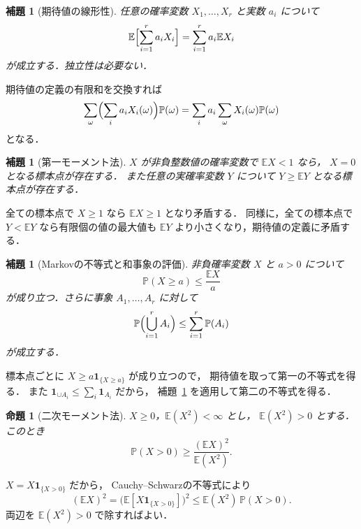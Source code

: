\documentclass[a5paper,10pt,onecolumn]{jsarticle}
\makeatletter
\theoremstyle{mathnotetheorem}
\newtheorem{lemma}[theorem]{補題}
\newtheorem{proposition}[theorem]{命題}
\renewcommand{\proofname}{証明}
\renewenvironment{proof}[1][\proofname]{%
  \par\pushQED{\qed}\normalfont\topsep4\p@\@plus2\p@\relax
  \trivlist\item[\hskip\labelsep\bfseries #1]\ignorespaces
}{\popQED\endtrivlist\@endpefalse}
\makeatother
\begin{document}
\begin{lemma}[期待値の線形性]\label{lem:linearity}
任意の確率変数 $X_1,\ldots,X_r$ と実数 $a_i$ について
\[
 \mathbb E\Bigl[\sum_{i=1}^ra_iX_i\Bigr]
 =\sum_{i=1}^ra_i\mathbb EX_i
\]
が成立する．独立性は必要ない．
\end{lemma}
\begin{proof}
期待値の定義の有限和を交換すれば
\[
 \sum_\omega\Bigl(\sum_i a_iX_i(\omega)\Bigr)\mathbb P(\omega)
 =\sum_i a_i\sum_\omega X_i(\omega)\mathbb P(\omega)
\]
となる．
\end{proof}

\begin{lemma}[第一モーメント法]\label{lem:firstmoment}
$X$ が非負整数値の確率変数で $\mathbb EX<1$ なら，
$X=0$ となる標本点が存在する．
また任意の実確率変数 $Y$ について
$Y\ge\mathbb EY$ となる標本点が存在する．
\end{lemma}
\begin{proof}
全ての標本点で $X\ge1$ なら $\mathbb EX\ge1$ となり矛盾する．
同様に，全ての標本点で $Y<\mathbb EY$ なら有限個の値の最大値も
$\mathbb EY$ より小さくなり，期待値の定義に矛盾する．
\end{proof}

\begin{lemma}[Markovの不等式と和事象の評価]\label{lem:markov}
非負確率変数 $X$ と $a>0$ について
\[
 \mathbb P(X\ge a)\le\frac{\mathbb EX}{a}
\]
が成り立つ．さらに事象 $A_1,\ldots,A_r$ に対して
\[
 \mathbb P\Bigl(\bigcup_{i=1}^rA_i\Bigr)
 \le\sum_{i=1}^r\mathbb P(A_i)
\]
が成立する．
\end{lemma}
\begin{proof}
標本点ごとに $X\ge a\mathbf1_{\{X\ge a\}}$ が成り立つので，
期待値を取って第一の不等式を得る．
また $\mathbf1_{\cup A_i}\le\sum_i\mathbf1_{A_i}$ だから，
補題~\ref{lem:linearity} を適用して第二の不等式を得る．
\end{proof}

\begin{proposition}[二次モーメント法]\label{prop:secondmoment}
$X\ge0$，$\mathbb E(X^2)<\infty$ とし，
$\mathbb E(X^2)>0$ とする．このとき
\[
 \mathbb P(X>0)\ge\frac{(\mathbb EX)^2}{\mathbb E(X^2)}.
\]
\end{proposition}
\begin{proof}
$X=X\mathbf1_{\{X>0\}}$ だから，
Cauchy--Schwarzの不等式により
\[
 (\mathbb EX)^2
 =\bigl(\mathbb E[X\mathbf1_{\{X>0\}}]\bigr)^2
 \le\mathbb E(X^2)\,\mathbb P(X>0).
\]
両辺を $\mathbb E(X^2)>0$ で除すればよい．
\end{proof}
\end{document}
